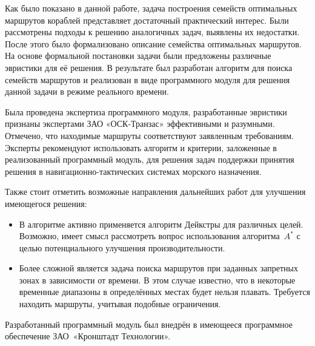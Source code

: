 \startconclusionpage

Как было показано в данной работе, задача построения семейств
оптимальных маршрутов кораблей представляет достаточный практический
интерес. Были рассмотрены подходы к решению аналогичных задач,
выявлены их недостатки. После этого было формализовано описание
семейства оптимальных маршрутов. На основе формальной постановки
задачи были предложены различные эвристики для её решения. В
результате был разработан алгоритм для поиска семейств маршрутов и
реализован в виде программного модуля для решения данной задачи в
режиме реального времени.

Была проведена экспертиза программного модуля, разработанные эвристики
признаны экспертами ЗАО «ОСК-Транзас» эффективными и разумными.
Отмечено, что находимые маршруты соответствуют заявленным требованиям.
Эксперты рекомендуют использовать алгоритм и критерии, заложенные в
реализованный программный модуль, для решения задач поддержки принятия
решения в навигационно-тактических системах морского назначения.

Также стоит отметить возможные направления дальнейших работ для
улучшения имеющегося решения:
\begin{itemize}
    \item В алгоритме активно применяется алгоритм Дейкстры для различных
      целей. Возможно, имеет смысл рассмотреть вопрос использования
      алгоритма~$A^*$ с целью потенциального улучшения производительности.
    \item Более сложной является задача поиска маршрутов при заданных
      запретных зонах в зависимости от времени. В этом случае
      известно, что в некоторые временные диапазоны в определённых
      местах будет нельзя плавать. Требуется находить маршруты,
      учитывая подобные ограничения.
\end{itemize}

Разработанный программный модуль был внедрён в имеющееся программное
обеспечение ЗАО~«Кронштадт Технологии».

\FloatBarrier

